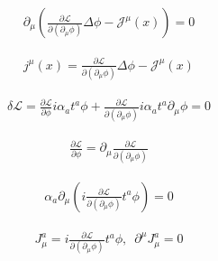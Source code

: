 \documentclass[floatfix,nofootinbib,superscriptaddress,fleqn]{revtex4}
\begin{document}
\begin{align*}
\partial_\mu
  \left(\frac{\partial\mathcal{L}}
  {\partial(\partial_\mu\phi)}\Delta\phi
  -\mathcal{J}^\mu(x)\right)
  =0
\end{align*}

\begin{align*}
  j^\mu(x) = \frac{\partial\mathcal{L}}
  {\partial(\partial_\mu\phi)}\Delta\phi
  -\mathcal{J}^\mu(x)
\end{align*}

\begin{align*}
  \delta\mathcal{L} = \frac{\partial \mathcal{L}}{\partial \phi}i\alpha_at^a\phi
  +\frac{\partial\mathcal{L}}{\partial(\partial_\mu\phi)}i\alpha_at^a\partial_\mu
  \phi=0
\end{align*}

\begin{align*}
  \frac{\partial\mathcal{L}}{\partial\phi}=
  \partial_\mu\frac{\partial\mathcal{L}}{\partial(\partial_\mu\phi)}
\end{align*}


\begin{align*}
  \alpha_a\partial_\mu\left(i
  \frac{\partial\mathcal{L}}{\partial(\partial_\mu\phi)}
  t^a\phi\right)=0
\end{align*}

\begin{align*}
  J^a_\mu=
  i\frac{\partial\mathcal{L}}{\partial(\partial_\mu\phi)}
  t^a\phi,\,\,\,
  \partial^\mu J^a_\mu=0
\end{align*}
\end{document}
